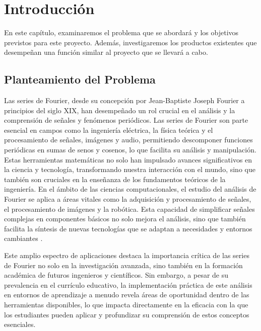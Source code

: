 \chapter{Introducción}\label{ch:Introducción}
En este capítulo, examinaremos el problema que se abordará y los objetivos previstos para este proyecto. Además, investigaremos los productos existentes que desempeñan una función similar al proyecto que se llevará a cabo.

\section{Planteamiento del Problema}
Las series de Fourier, desde su concepción por Jean-Baptiste Joseph Fourier a principios del siglo XIX, han desempeñado un rol crucial en el análisis y la comprensión de señales y fenómenos periódicos. Las series de Fourier son parte esencial en campos como la ingeniería eléctrica, la física teórica y el procesamiento de señales, imágenes y audio, permitiendo descomponer funciones periódicas en sumas de senos y cosenos, lo que facilita su análisis y manipulación. Estas herramientas matemáticas no solo han impulsado avances significativos en la ciencia y tecnología, transformando nuestra interacción con el mundo, sino que también son cruciales en la enseñanza de los fundamentos teóricos de la ingeniería. En el ámbito de las ciencias computacionales, el estudio del análisis de Fourier se aplica a áreas vitales como la adquisición y procesamiento de señales, el procesamiento de imágenes y la robótica. Esta capacidad de simplificar señales complejas en componentes básicos no solo mejora el análisis, sino que también facilita la síntesis de nuevas tecnologías que se adaptan a necesidades y entornos cambiantes \cite{almira2017fourier}.

Este amplio espectro de aplicaciones destaca la importancia crítica de las series de Fourier no solo en la investigación avanzada, sino también en la formación académica de futuros ingenieros y científicos. Sin embargo, a pesar de su prevalencia en el currículo educativo, la implementación práctica de este análisis en entornos de aprendizaje a menudo revela áreas de oportunidad dentro de las herramientas disponibles, lo que impacta directamente en la eficacia con la que los estudiantes pueden aplicar y profundizar su comprensión de estos conceptos esenciales.

